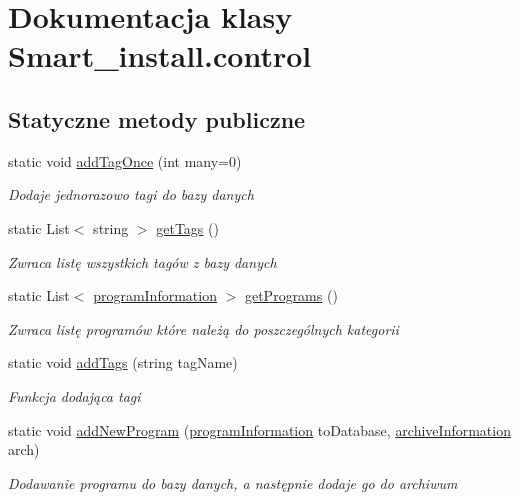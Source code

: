 \hypertarget{class_smart__install_1_1control}{\section{Dokumentacja klasy Smart\+\_\+install.\+control}
\label{class_smart__install_1_1control}
}
\subsection*{Statyczne metody publiczne}
\begin{DoxyCompactItemize}
\item 
static void \hyperlink{class_smart__install_1_1control_aba6fdac0d5bfe111b9c996ca8f13ecc7}{add\+Tag\+Once} (int many=0)
\begin{DoxyCompactList}\small\item\em Dodaje jednorazowo tagi do bazy danych \end{DoxyCompactList}\item 
static List$<$ string $>$ \hyperlink{class_smart__install_1_1control_a1071182d792dc84a90ff4faf43063e72}{get\+Tags} ()
\begin{DoxyCompactList}\small\item\em Zwraca listę wszystkich tagów z bazy danych \end{DoxyCompactList}\item 
static List$<$ \hyperlink{class_smart__install_1_1program_information}{program\+Information} $>$ \hyperlink{class_smart__install_1_1control_a624190faac409378f145ff96ed45cd66}{get\+Programs} ()
\begin{DoxyCompactList}\small\item\em Zwraca listę programów które należą do poszczególnych kategorii \end{DoxyCompactList}\item 
static void \hyperlink{class_smart__install_1_1control_a466ee8b7a313e443a2e641a743b179d5}{add\+Tags} (string tag\+Name)
\begin{DoxyCompactList}\small\item\em Funkcja dodająca tagi \end{DoxyCompactList}\item 
static void \hyperlink{class_smart__install_1_1control_ad7268cac335d4bea0fde187371801e81}{add\+New\+Program} (\hyperlink{class_smart__install_1_1program_information}{program\+Information} to\+Database, \hyperlink{class_smart__install_1_1archive_information}{archive\+Information} arch)
\begin{DoxyCompactList}\small\item\em Dodawanie programu do bazy danych, a następnie dodaje go do archiwum \end{DoxyCompactList}\item 

\end{DoxyCompactItemize}
